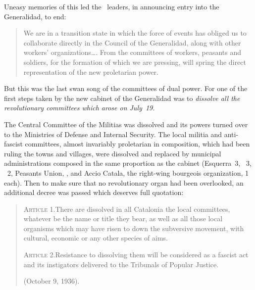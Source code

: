 Uneasy memories of this led the \POUM\ leaders, in announcing entry into the Generalidad, to end:

\begin{quotation}
  We are in a transition state in which the force of events has obliged us to collaborate directly in the Council of the Generalidad, along with other workers’ organizations\dots. From the committees of workers, peasants and soldiers, for the formation of which we are pressing, will spring the direct representation of the new proletarian power.
\end{quotation}

But this was the last swan song of the committees of dual power. For one of the first steps taken by the new cabinet of the Generalidad was to \emph{dissolve all the revolutionary committees which arose on July~19.}

The Central Committee of the Militias was dissolved and its powers turned over to the Ministries of Defense and Internal Security. The local militia and anti-fascist committees, almost invariably proletarian in composition, which had been ruling the towns and villages, were dissolved and replaced by municipal administrations composed in the same proportion as the cabinet (Esquerra~3, \CNT~3, \PSUC~2, Peasants Union, \POUM, and Accio Catala, the right-wing bourgeois organization, 1 each). Then to make sure that no revolutionary organ had been overlooked, an additional decree was passed which deserves full quotation:

\begin{quote}
  \textsc{\textsf{Article 1.}}\quad There are dissolved in all Catalonia the local committees, whatever be the name or title they bear, as well as all those local organisms which may have risen to down the subversive movement, with cultural, economic or any other species of aims.
  
  \textsc{\textsf{Article 2.}}\quad Resistance to dissolving them will be considered as a fascist act and its instigators delivered to the Tribunals of Popular Justice.
  
  (October 9, 1936).
\end{quote}

